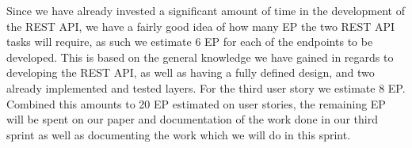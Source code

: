\bigskip \noindent
Since we have already invested a significant amount of time in the development of the REST API, we have a fairly good idea of how many EP the two REST API tasks will require, as such we estimate 6 EP for each of the endpoints to be developed.
This is based on the general knowledge we have gained in regards to developing the REST API, as well as having a fully defined design, and two already implemented and tested layers.%
For the third user story we estimate 8 EP.
Combined this amounts to 20 EP estimated on user stories, the remaining EP will be spent on our paper and documentation of the work done in our third sprint as well as documenting the work which we will do in this sprint.